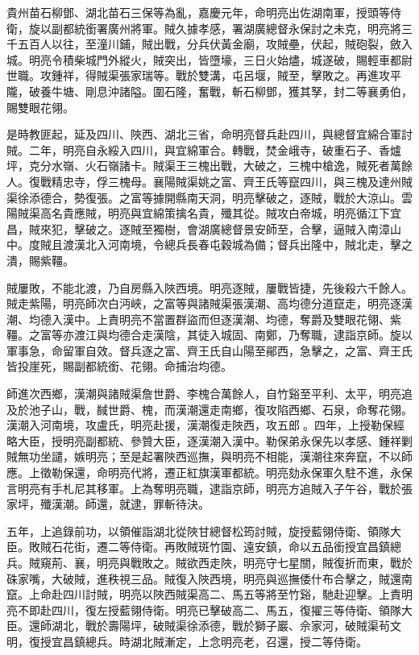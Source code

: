 \begin{pinyinscope}
貴州苗石柳鄧、湖北苗石三保等為亂，嘉慶元年，命明亮出佐湖南軍，授頭等侍衛，旋以副都統銜署廣州將軍。賊久據孝感，署湖廣總督永保討之未克，明亮將三千五百人以往，至潼川鋪，賊出戰，分兵伏黃金廟，攻賊壘，伏起，賊砲裂，斂入城。明亮令積柴城門外縱火，賊突出，皆墮壕，三日火始燼，城遂破，賜輕車都尉世職。攻鍾祥，得賊渠張家瑞等。戰於雙溝，屯呂堰，賊至，擊敗之。再進攻平隴，破養牛塘、剛息沖諸隘。圍石隆，奮戰，斬石柳鄧，獲其孥，封二等襄勇伯，賜雙眼花翎。

是時教匪起，延及四川、陜西、湖北三省，命明亮督兵赴四川，與總督宜綿合軍討賊。二年，明亮自永綏入四川，與宜綿軍合。轉戰，焚金峨寺，破重石子、香爐坪，克分水嶺、火石嶺諸卡。賊渠王三槐出戰，大破之，三槐中槍逸，賊死者萬餘人。復戰精忠寺，俘三槐母。襄陽賊渠姚之富、齊王氏等竄四川，與三槐及達州賊渠徐添德合，勢復張。之富等據開縣南天洞，明亮擊破之，逐賊，戰於大涼山。雲陽賊渠高名貴應賊，明亮與宜綿策擒名貴，殲其從。賊攻白帝城，明亮循江下宜昌，賊來犯，擊破之。逐賊至獨樹，會湖廣總督景安師至，合擊，逼賊入南漳山中。度賊且渡漢北入河南境，令總兵長春屯穀城為備；督兵出隆中，賊北走，擊之潰，賜紫韁。

賊屢敗，不能北渡，乃自房縣入陜西境。明亮逐賊，屢戰皆捷，先後殺六千餘人。賊走紫陽，明亮師次白沔峽，之富等與諸賊渠張漢潮、高均德分道竄走，明亮逐漢潮、均德入漢中。上責明亮不當置群盜而但逐漢潮、均德，奪爵及雙眼花翎、紫韁。之富等亦渡江與均德合走漢陰，其徒入城固、南鄭，乃奪職，逮詣京師。旋以軍事急，命留軍自效。督兵逐之富、齊王氏自山陽至鄖西，急擊之，之富、齊王氏皆投崖死，賜副都統銜、花翎。命捕治均德。

師進次西鄉，漢潮與諸賊渠詹世爵、李槐合萬餘人，自竹谿至平利、太平，明亮追及於池子山，戰，馘世爵、槐，而漢潮還走南鄉，復攻陷西鄉、石泉，命奪花翎。漢潮入河南境，攻盧氏，明亮赴援，漢潮復走陜西，攻五郎。四年，上授勒保經略大臣，授明亮副都統、參贊大臣，逐漢潮入漢中。勒保弟永保先以孝感、鍾祥剿賊無功坐譴，嫉明亮；至是起署陜西巡撫，與明亮不相能，漢潮往來奔竄，不以師應。上徵勒保還，命明亮代將，遷正紅旗漢軍都統。明亮劾永保軍久駐不進，永保言明亮有手札尼其移軍。上為奪明亮職，逮詣京師，明亮方追賊入子午谷，戰於張家坪，殲漢潮。師還，就逮，罪斬待決。

五年，上追錄前功，以領催詣湖北從陜甘總督松筠討賊，旋授藍翎侍衛、領隊大臣。敗賊石花街，遷二等侍衛。再敗賊斑竹園、遠安鎮，命以五品銜授宜昌鎮總兵。賊窺荊、襄，明亮與戰敗之。賊欲西走陜，明亮守七星關，賊復折而東，戰於硃家嘴，大破賊，進秩視三品。賊復入陜西境，明亮與巡撫倭什布合擊之，賊還南竄。上命赴四川討賊，明亮以陜西賊渠高二、馬五等將至竹谿，馳赴迎擊。上責明亮不即赴四川，復左授藍翎侍衛。明亮已擊破高二、馬五，復擢三等侍衛、領隊大臣。還師湖北，戰於壽陽坪，破賊渠徐添德，戰於獅子巖、佘家河，破賊渠茍文明，復授宜昌鎮總兵。時湖北賊漸定，上念明亮老，召還，授二等侍衛。


\end{pinyinscope}
